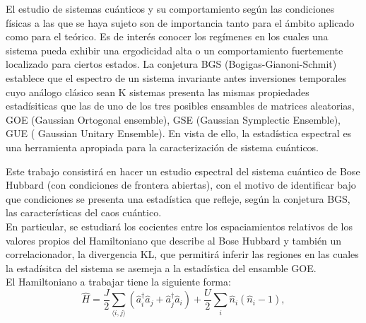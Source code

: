 \documentclass[spanish,titlepage,table]{practicas}
\begin{document}
El estudio de sistemas cuánticos y su comportamiento según las condiciones físicas a las que se haya sujeto 
son de importancia tanto para el ámbito aplicado como para el teórico. 
Es de interés conocer los regímenes 
en los cuales una sistema pueda exhibir una ergodicidad alta o un comportamiento fuertemente localizado para ciertos estados.
La conjetura BGS (Bogigas-Gianoni-Schmit) establece que el espectro de un sistema invariante antes inversiones temporales 
cuyo análogo clásico sean K sistemas presenta las mismas propiedades estadísiticas que las de uno de los 
tres posibles ensambles de matrices aleatorias, GOE (Gaussian Ortogonal ensemble), GSE (Gaussian Symplectic Ensemble),
GUE ( Gaussian Unitary Ensemble). %
 En vista de ello, la estadística espectral es una 
herramienta apropiada para la caracterización de sistema cuánticos. 

Este trabajo consistirá en hacer un estudio espectral del sistema cuántico de Bose Hubbard (con condiciones de frontera abiertas), con el motivo de identificar bajo que condiciones 
se presenta una estadística que refleje, según la conjetura BGS, las características del caos cuántico. \\ 
En particular, se estudiará los cocientes entre los espaciamientos relativos de los valores propios del Hamiltoniano que describe al Bose Hubbard 
y también un correlacionador, la divergencia KL, que permitirá inferir las regiones  en las cuales la estadísitca del sistema 
se asemeja a la estadística del ensamble GOE.
\\
El Hamiltoniano a trabajar tiene la siguiente forma:
\[
\hat{H}
= \frac{J}{2} \sum_{\langle i,j\rangle} \!\left(\hat{a}_i^{\dagger}\hat{a}_j + \hat{a}_j^{\dagger}\hat{a}_i\right)
+ \frac{U}{2}\sum_{i}\hat{n}_i(\hat{n}_i - 1),
\]
\end{document}
